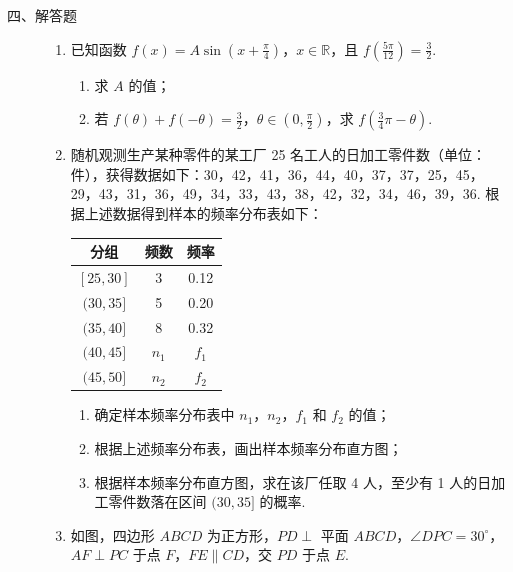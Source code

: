 \begin{description}

    \item[四、解答题]

    \begin{enumerate}[leftmargin=5pt]

      \addtocounter{enumi}{+15}

        \item 已知函数 \(f(x) = A \sin \left( x + \frac{\pi}{4} \right)\)，\(x \in \mathbb{R}\)，且 \( f\left( \frac{5\pi}{12} \right) = \frac{3}{2} \).

\begin{enumerate}
\item 求 \(A\) 的值；
\item 若 \(f(\theta) + f(-\theta) = \frac{3}{2}\)，\(\theta \in \left(0, \frac{\pi}{2}\right)\)，求 \( f\left(\frac{3}{4}\pi - \theta\right) \).
\end{enumerate}

        \item 随机观测生产某种零件的某工厂 25 名工人的日加工零件数（单位：件），获得数据如下：30，42，41，36，44，40，37，37，25，45，29，43，31，36，49，34，33，43，38，42，32，34，46，39，36.
根据上述数据得到样本的频率分布表如下：

\begin{center}
\begin{tabular}{c|cc}
\hline
分组 & 频数 & 频率 \\
\hline
\([25,30]\) & 3 & 0.12 \\
\((30,35]\) & 5 & 0.20 \\
\((35,40]\) & 8 & 0.32 \\
\((40,45]\) & \(n_1\) & \(f_1\) \\
\((45,50]\) & \(n_2\) & \(f_2\) \\
\hline
\end{tabular}
\end{center}

\begin{enumerate}
\item 确定样本频率分布表中 \(n_1\)，\(n_2\)，\(f_1\) 和 \(f_2\) 的值；
\item 根据上述频率分布表，画出样本频率分布直方图；
\item 根据样本频率分布直方图，求在该厂任取 4 人，至少有 1 人的日加工零件数落在区间 \((30,35]\) 的概率.
\end{enumerate}

        \item 如图，四边形 \(ABCD\) 为正方形，\(PD \perp\) 平面 \(ABCD\)，\(\angle DPC = 30^{\circ}\)，\(AF \perp PC\) 于点 \(F\)，\(FE \parallel CD\)，交 \(PD\) 于点 \(E\).


\end{enumerate}
\end{description}
